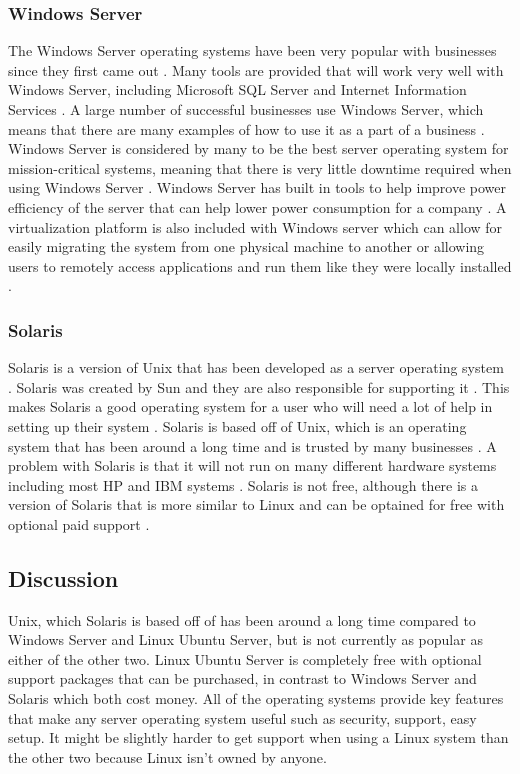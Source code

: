 \documentclass[onecolumn, draftclsnofoot,10pt, compsoc]{IEEEtran}
\begin{document}
\subsubsection{Windows Server}
The Windows Server operating systems have been very popular with businesses since they first came out \cite{windows}. Many tools are provided that will work very well with Windows Server, including Microsoft SQL Server and Internet Information Services \cite{windows}. A large number of successful businesses use Windows Server, which means that there are many examples of how to use it as a part of a business \cite{windows}. Windows Server is considered by many to be the best server operating system for mission-critical systems, meaning that there is very little downtime required when using Windows Server \cite{windows}. Windows Server has built in tools to help improve power efficiency of the server that can help lower power consumption for a company \cite{windows}. A virtualization platform is also included with Windows server which can allow for easily migrating the system from one physical machine to another or allowing users to remotely access applications and run them like they were locally installed \cite{windows}.

\subsubsection{Solaris}
Solaris is a version of Unix that has been developed as a server operating system \cite{solaris}. Solaris was created by Sun and they are also responsible for supporting it \cite{solaris}. This makes Solaris a good operating system for a user who will need a lot of help in setting up their system \cite{solaris}. Solaris is based off of Unix, which is an operating system that has been around a long time and is trusted by many businesses \cite{solaris}. A problem with Solaris is that it will not run on many different hardware systems including most HP and IBM systems \cite{solaris}. Solaris is not free, although there is a version of Solaris that is more similar to Linux and can be optained for free with optional paid support \cite{solaris}.

\subsection{Discussion}
Unix, which Solaris is based off of has been around a long time compared to Windows Server and Linux Ubuntu Server, but is not currently as popular as either of the other two. Linux Ubuntu Server is completely free with optional support packages that can be purchased, in contrast to Windows Server and Solaris which both cost money. All of the operating systems provide key features that make any server operating system useful such as security, support, easy setup. It might be slightly harder to get support when using a Linux system than the other two because Linux isn't owned by anyone.
\end{document}
